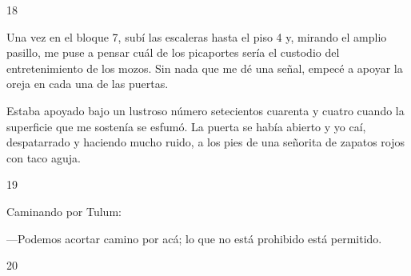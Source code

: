 \documentclass[12pt,twoside,openright,a5paper]{book}
\begin{document}
\vspace{0.5cm}

\hrulefill \hspace{0.1cm}\decofourleft\hspace{0.2cm} 18 \hspace{0.2cm}\decofourright \hspace{0.1cm}\hrulefill

\nopagebreak

\vspace{0.5cm}

\nopagebreak

Una vez en el bloque 7, subí las escaleras hasta el piso 4 y,
mirando el amplio pasillo, me puse a pensar cuál de los picaportes sería el
custodio del entretenimiento de los mozos. Sin nada que me dé una señal,
empecé a apoyar la oreja en cada una de las puertas.

Estaba apoyado bajo un lustroso número setecientos cuarenta y cuatro cuando la superficie que me
sostenía se esfumó. La puerta se había abierto y yo caí, despatarrado
y haciendo mucho ruido, a los pies de una señorita de zapatos rojos con
taco aguja.

\vspace{0.5cm}

\hrulefill \hspace{0.1cm}\decofourleft\hspace{0.2cm} 19 \hspace{0.2cm}\decofourright \hspace{0.1cm}\hrulefill

\nopagebreak

\vspace{0.5cm}

\nopagebreak

Caminando por Tulum:

---Podemos acortar camino por acá; lo que no está
prohibido está permitido.

\vspace{0.5cm}

\hrulefill \hspace{0.1cm}\decofourleft\hspace{0.2cm} 20 \hspace{0.2cm}\decofourright \hspace{0.1cm}\hrulefill

\nopagebreak

\vspace{0.5cm}

\nopagebreak
\end{document}
